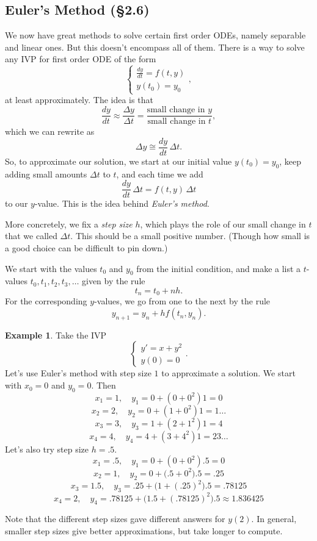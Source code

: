 \documentclass[12pt]{amsart}
\numberwithin{equation}{section}
\theoremstyle{plain} %
\theoremstyle{definition}
\newtheorem{ex}[equation]{Example}
\theoremstyle{remark}
\begin{document}
\subsection*{Euler's Method (\S2.6)}

We now have great methods to solve certain first order ODEs, namely separable and linear ones. But this doesn't encompass all of them. There is a way to solve any IVP for first order ODE of the form
\[\begin{cases} \frac{dy}{dt} = f(t,y) \\ y(t_0) = y_0\end{cases},\]
at least approximately.  The idea is that 
\[\frac{dy}{dt}\approx \frac{\Delta y}{\Delta t} = \frac{\text{small change in $y$}}{\text{small change in $t$}},\]
which we can rewrite as \[\Delta y \cong \frac{dy}{dt} \, \Delta t.\]
So, to approximate our solution, we start at our initial value $y(t_0) = y_0$, keep adding small amounts $\Delta t$ to $t$, and each time we add
\[ \frac{dy}{dt} \, \Delta t = f(t,y) \, \Delta t \] to our $y$-value. This is the idea behind \emph{Euler's method}.

More concretely, we fix a \emph{step size} $h$, which plays the role of our small change in $t$ that we called $\Delta t$. This should be a small positive number. (Though how small is a good choice can be difficult to pin down.) 

We start with the values $t_0$ and $y_0$ from the initial condition, and make a list a $t$-values $t_0,t_1,t_2,t_3,\dots$ given by the rule 
\[ t_n = t_0 + n h.\]
For the corresponding $y$-values, we go from one to the next by the rule
\[ y_{n+1}  = y_n + h f(t_n, y_n).\]

\begin{ex}
Take the IVP 
\[ \begin{cases} y' = x + y^2 \\
y(0)=0\end{cases}.\]
Let's use Euler's method with step size $1$ to approximate a solution.
We start with $x_0 = 0$ and $y_0 = 0$.
Then
\[ x_1 = 1, \quad y_1 = 0 + ( 0 + 0^2) 1 = 0\]
\[ x_2 = 2, \quad y_2 = 0 + ( 1 + 0^2) 1 = 1\dots\]
\[ x_3 = 3, \quad y_3 = 1 + ( 2 + 1^2 ) 1 = 4\]
\[ x_4 = 4, \quad y_4 = 4 + ( 3 + 4^2 )1 = 23\dots\]
Let's also try step size $h=.5$.
\[x_1 = .5 , \quad y_1 = 0+ (0+0^2) .5 = 0\]
\[x_2 = 1, \quad y_2 = 0+ \big(.5 +0^2\big) .5 = .25\]
\[x_3 = 1.5 , \quad y_3 = .25 + \big(1 +(.25)^2\big) .5 = .78125 \]
\[x_4 = 2, \quad y_4 = .78125 + \big(1.5 +(.78125)^2\big) .5 \approx 1.836425 \]

Note that the different step sizes gave different answers for $y(2)$. In general, smaller step sizes give better approximations, but take longer to compute.
\end{ex}
\end{document}
